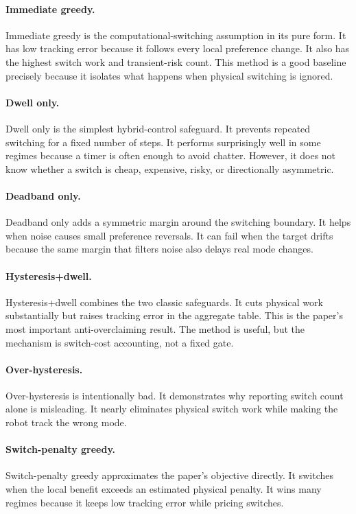 \documentclass{article}
\begin{document}
\paragraph{Immediate greedy.}
Immediate greedy is the computational-switching assumption in its pure form.
It has low tracking error because it follows every local preference change.
It also has the highest switch work and transient-risk count.
This method is a good baseline precisely because it isolates what happens when physical switching is ignored.

\paragraph{Dwell only.}
Dwell only is the simplest hybrid-control safeguard.
It prevents repeated switching for a fixed number of steps.
It performs surprisingly well in some regimes because a timer is often enough to avoid chatter.
However, it does not know whether a switch is cheap, expensive, risky, or directionally asymmetric.

\paragraph{Deadband only.}
Deadband only adds a symmetric margin around the switching boundary.
It helps when noise causes small preference reversals.
It can fail when the target drifts because the same margin that filters noise also delays real mode changes.

\paragraph{Hysteresis+dwell.}
Hysteresis+dwell combines the two classic safeguards.
It cuts physical work substantially but raises tracking error in the aggregate table.
This is the paper's most important anti-overclaiming result.
The method is useful, but the mechanism is switch-cost accounting, not a fixed gate.

\paragraph{Over-hysteresis.}
Over-hysteresis is intentionally bad.
It demonstrates why reporting switch count alone is misleading.
It nearly eliminates physical switch work while making the robot track the wrong mode.

\paragraph{Switch-penalty greedy.}
Switch-penalty greedy approximates the paper's objective directly.
It switches when the local benefit exceeds an estimated physical penalty.
It wins many regimes because it keeps low tracking error while pricing switches.
\end{document}
